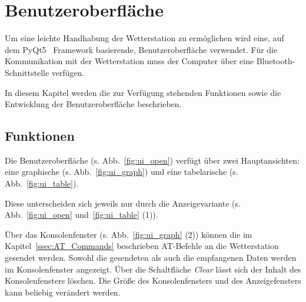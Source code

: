 \pagebreak
\section{Benutzeroberfläche}\label{sec:benutzeroberflaeche}
Um eine leichte Handhabung der Wetterstation zu ermöglichen wird eine, auf dem PyQt5~\cite{pyqt5} Framework basierende, Benutzeroberfläche verwendet. Für die Kommunikation mit der Wetterstation muss der Computer über eine Bluetooth-Schnittstelle verfügen.

In diesem Kapitel werden die zur Verfügung stehenden Funktionen sowie die Entwicklung der Benutzeroberfläche beschrieben.

\subsection{Funktionen}\label{sec:bo_funktionen}
Die Benutzeroberfläche (s. Abb.~\ref{fig:ui_open}) verfügt über zwei Hauptansichten: eine graphische (s. Abb.~\ref{fig:ui_graph}) und eine tabelarische (s. Abb.~\ref{fig:ui_table}).

Diese unterscheiden sich jeweils nur durch die Anzeigevariante (s. Abb.~\ref{fig:ui_open} und~\ref{fig:ui_table} (1)).

Über das Konsolenfenster (s. Abb.~\ref{fig:ui_graph} (2)) können die im Kapitel~\ref{ssec:AT_Commands} beschrieben AT-Befehle an die Wetterstation gesendet werden. Sowohl die gesendeten als auch die empfangenen Daten werden im Konsolenfenster angezeigt. Über die Schaltfläche \emph{Clear} lässt sich der Inhalt des Konsolenfensters löschen. Die Größe des Konsolenfensters und des Anzeigefensters kann beliebig verändert werden.

